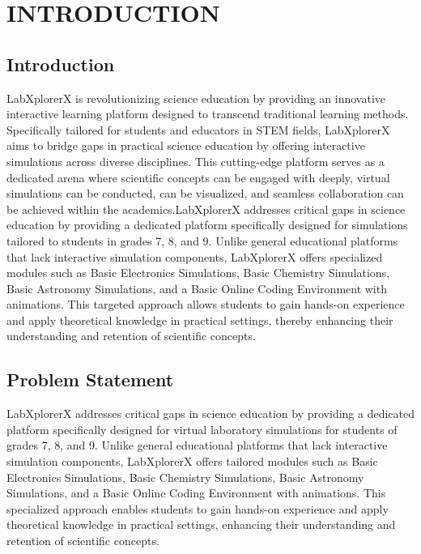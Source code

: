 \chapter{INTRODUCTION}



\section{Introduction}
LabXplorerX is revolutionizing science education by providing an innovative interactive learning platform designed to transcend traditional learning methods. Specifically tailored for students and educators in STEM fields, LabXplorerX aims to bridge gaps in practical science education by offering interactive simulations across diverse disciplines. This cutting-edge platform serves as a dedicated arena where scientific concepts can be engaged with deeply, virtual simulations can be conducted, can be visualized, and seamless collaboration can be achieved within the academics.LabXplorerX addresses critical gaps in science education by providing a dedicated platform specifically designed for simulations tailored to students in grades 7, 8, and 9. Unlike general educational platforms that lack interactive simulation components, LabXplorerX offers specialized modules such as Basic Electronics Simulations, Basic Chemistry Simulations, Basic Astronomy Simulations, and a Basic Online Coding Environment with animations. This targeted approach allows students to gain hands-on experience and apply theoretical knowledge in practical settings, thereby enhancing their understanding and retention of scientific concepts.


\section{Problem Statement }
LabXplorerX addresses critical gaps in science education by providing a dedicated platform specifically designed for virtual laboratory simulations for students of grades 7, 8, and 9. Unlike general educational platforms that lack interactive simulation components, LabXplorerX offers tailored modules such as Basic Electronics Simulations, Basic Chemistry Simulations, Basic Astronomy Simulations, and a Basic Online Coding Environment with animations. This specialized approach enables students to gain hands-on experience and apply theoretical knowledge in practical settings, enhancing their understanding and retention of scientific concepts.

